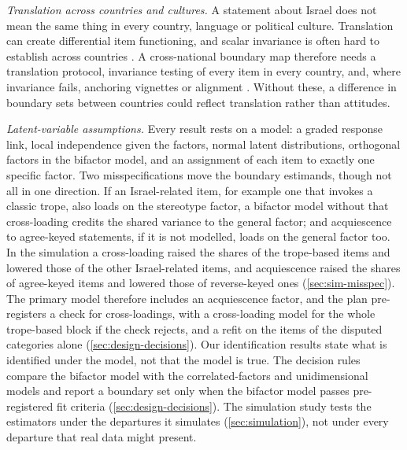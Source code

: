 \emph{Translation across countries and cultures.} A statement about Israel
does not mean the same thing in every country, language or political
culture. Translation can create differential item functioning, and scalar
invariance is often hard to establish across countries
\citep{davidov2014,steenkamp1998}. A cross-national boundary map therefore
needs a translation protocol, invariance testing of every item in every
country, and, where invariance fails, anchoring vignettes \citep{king2004} or
alignment \citep{asparouhov2014}. Without these, a difference in boundary
sets between countries could reflect translation rather than attitudes.

\emph{Latent-variable assumptions.} Every result rests on a model: a graded
response link, local independence given the factors, normal latent
distributions, orthogonal factors in the bifactor model, and an assignment of
each item to exactly one specific factor. Two misspecifications move the
boundary estimands, though not all in one direction. If an Israel-related
item, for example one that invokes a classic trope, also loads on the
stereotype factor, a bifactor model without that cross-loading credits the
shared variance to the general factor; and acquiescence to agree-keyed
statements, if it is not modelled, loads on the general factor too. In the
simulation a cross-loading raised the shares of the trope-based items and
lowered those of the other Israel-related items, and acquiescence raised the
shares of agree-keyed items and lowered those of reverse-keyed ones
(\cref{sec:sim-misspec}). The primary model therefore includes an
acquiescence factor, and the plan pre-registers a check for cross-loadings,
with a cross-loading model for the whole trope-based block if the check
rejects, and a refit on the items of the disputed categories alone
(\cref{sec:design-decisions}). Our
identification results state what is identified under the model, not that
the model is true. The decision rules compare the bifactor model with the
correlated-factors and unidimensional models and report a boundary set only
when the bifactor model passes pre-registered fit criteria
(\cref{sec:design-decisions}). The simulation study tests the estimators
under the departures it simulates (\cref{sec:simulation}), not under every
departure that real data might present.

